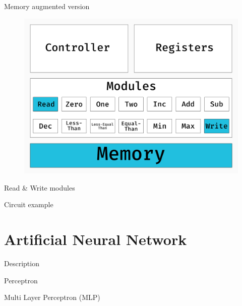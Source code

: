 \documentclass{beamer}
\begin{document}
  \begin{frame}{Memory augmented version}
  	\begin{figure}
  		\centering
  		\includegraphics[width=\textwidth]{../figures/schema-nram-with-memory.png}
  	\end{figure}
  \end{frame}
  \begin{frame}{Read \& Write modules}
  
  \end{frame}
  \begin{frame}{Circuit example}
 		
  \end{frame}
  
  \section{Artificial Neural Network}
  \begin{frame}{Description}
  
  \end{frame}
  \begin{frame}{Perceptron}
  	
  \end{frame}
  \begin{frame}{Multi Layer Perceptron (MLP)}
  	
  \end{frame}
  
\end{document}
